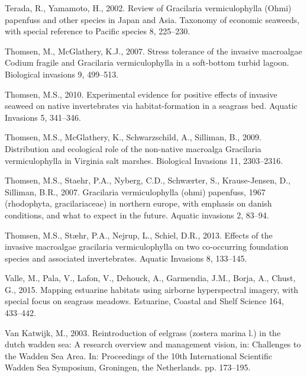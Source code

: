 \documentclass[
  letterpaper,
  DIV=11,
  numbers=noendperiod]{scrartcl}
\newlength{\cslhangindent}
\newenvironment{CSLReferences}[2] %
 {\begin{list}{}{%
  \setlength{\itemindent}{0pt}
  \setlength{\leftmargin}{0pt}
  \setlength{\parsep}{0pt}
  \ifodd #1
   \setlength{\leftmargin}{\cslhangindent}
   \setlength{\itemindent}{-1\cslhangindent}
  \fi
  \setlength{\itemsep}{#2\baselineskip}}}
 {\end{list}}
\begin{document}
\begin{CSLReferences}{1}{0}
Terada, R., Yamamoto, H., 2002. Review of {G}racilaria vermiculophylla
({O}hmi) papenfuss and other species in {J}apan and {A}sia. Taxonomy of
economic seaweeds, with special reference to Pacific species 8,
225--230.

Thomsen, M., McGlathery, K.J., 2007. Stress tolerance of the invasive
macroalgae {C}odium fragile and {G}racilaria vermiculophylla in a
soft-bottom turbid lagoon. Biological invasions 9, 499--513.

Thomsen, M.S., 2010. Experimental evidence for positive effects of
invasive seaweed on native invertebrates via habitat-formation in a
seagrass bed. Aquatic Invasions 5, 341--346.

Thomsen, M.S., McGlathery, K., Schwarzschild, A., Silliman, B., 2009.
Distribution and ecological role of the non-native macroalga
{G}racilaria vermiculophylla in {V}irginia salt marshes. Biological
Invasions 11, 2303--2316.

Thomsen, M.S., Staehr, P.A., Nyberg, C.D., Schwærter, S., Krause-Jensen,
D., Silliman, B.R., 2007. Gracilaria vermiculophylla (ohmi) papenfuss,
1967 (rhodophyta, gracilariaceae) in northern europe, with emphasis on
danish conditions, and what to expect in the future. Aquatic invasions
2, 83--94.

Thomsen, M.S., Stæhr, P.A., Nejrup, L., Schiel, D.R., 2013. Effects of
the invasive macroalgae gracilaria vermiculophylla on two co-occurring
foundation species and associated invertebrates. Aquatic Invasions 8,
133--145.

Valle, M., Pala, V., Lafon, V., Dehouck, A., Garmendia, J.M., Borja, A.,
Chust, G., 2015. Mapping estuarine habitats using airborne hyperspectral
imagery, with special focus on seagrass meadows. Estuarine, Coastal and
Shelf Science 164, 433--442.

Van Katwijk, M., 2003. Reintroduction of eelgrass (zostera marina l.) in
the dutch wadden sea: A research overview and management vision, in:
Challenges to the Wadden Sea Area. In: Proceedings of the 10th
International Scientific Wadden Sea Symposium, Groningen, the
Netherlands. pp. 173--195.


\end{CSLReferences}
\end{document}
